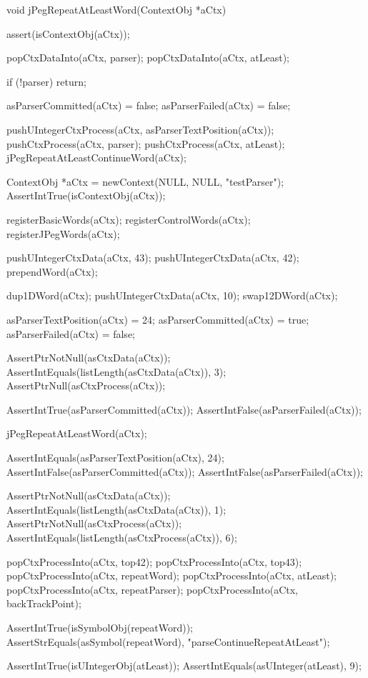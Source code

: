 \startCCode
void jPegRepeatAtLeastWord(ContextObj *aCtx) {
  assert(isContextObj(aCtx));
  
  popCtxDataInto(aCtx, parser);
  popCtxDataInto(aCtx, atLeast);
  
  if (!parser) return;
  
  asParserCommitted(aCtx) = false;
  asParserFailed(aCtx)    = false;
  
  pushUIntegerCtxProcess(aCtx, asParserTextPosition(aCtx));
  pushCtxProcess(aCtx, parser);
  pushCtxProcess(aCtx, atLeast);
  jPegRepeatAtLeastContinueWord(aCtx);
}
\stopCCode

\startCTest
  ContextObj *aCtx = newContext(NULL, NULL, "testParser");
  AssertIntTrue(isContextObj(aCtx));
  
  registerBasicWords(aCtx);
  registerControlWords(aCtx);
  registerJPegWords(aCtx);
  
  pushUIntegerCtxData(aCtx, 43);
  pushUIntegerCtxData(aCtx, 42);
  prependWord(aCtx);
  
  dup1DWord(aCtx);
  pushUIntegerCtxData(aCtx, 10);
  swap12DWord(aCtx);
  
  asParserTextPosition(aCtx) = 24;
  asParserCommitted(aCtx)    = true;
  asParserFailed(aCtx)       = false;
  
  AssertPtrNotNull(asCtxData(aCtx));
  AssertIntEquals(listLength(asCtxData(aCtx)), 3);
  AssertPtrNull(asCtxProcess(aCtx));
  
  AssertIntTrue(asParserCommitted(aCtx));
  AssertIntFalse(asParserFailed(aCtx));
  
  jPegRepeatAtLeastWord(aCtx);
  
  AssertIntEquals(asParserTextPosition(aCtx), 24);
  AssertIntFalse(asParserCommitted(aCtx));
  AssertIntFalse(asParserFailed(aCtx));
  
  AssertPtrNotNull(asCtxData(aCtx));
  AssertIntEquals(listLength(asCtxData(aCtx)), 1);
  AssertPtrNotNull(asCtxProcess(aCtx));
  AssertIntEquals(listLength(asCtxProcess(aCtx)), 6);
  
  popCtxProcessInto(aCtx, top42);
  popCtxProcessInto(aCtx, top43);
  popCtxProcessInto(aCtx, repeatWord);
  popCtxProcessInto(aCtx, atLeast);
  popCtxProcessInto(aCtx, repeatParser);
  popCtxProcessInto(aCtx, backTrackPoint);
  
  AssertIntTrue(isSymbolObj(repeatWord));
  AssertStrEquals(asSymbol(repeatWord), "parseContinueRepeatAtLeast");
  
  AssertIntTrue(isUIntegerObj(atLeast));
  AssertIntEquals(asUInteger(atLeast), 9);
  
